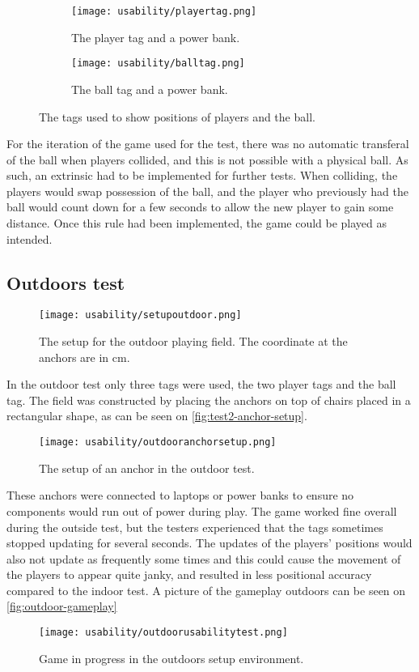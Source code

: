 \begin{figure}[H]
    \centering
    \begin{subfigure}{.45\textwidth}
        \centering
        \texttt{[image: usability/playertag.png]}
        \caption{The player tag and a power bank.}
        \label{fig:sub1}
    \end{subfigure}
    \begin{subfigure}{.45\textwidth}
        \centering
        \texttt{[image: usability/balltag.png]}
        \caption{The ball tag and a power bank.}
        \label{fig:sub2}
    \end{subfigure}
    \caption{The tags used to show positions of players and the ball.}
    \label{fig:two-tags}
\end{figure}
\noindent
For the iteration of the game used for the test, there was no automatic transferal of the ball when players collided, and this is not possible with a physical ball.
As such, an extrinsic had to be implemented for further tests.
When colliding, the players would swap possession of the ball, and the player who previously had the ball would count down for a few seconds to allow the new player to gain some distance.
Once this rule had been implemented, the game could be played as intended.

\subsection{Outdoors test}
\begin{figure}[H]
    \centering
    \texttt{[image: usability/setupoutdoor.png]}
    \caption{The setup for the outdoor playing field. The coordinate at the anchors are in cm.}
    \label{fig:test2-outdoor-setup}
\end{figure}
\noindent
In the outdoor test only three tags were used, the two player tags and the ball tag.
The field was constructed by placing the anchors on top of chairs placed in a rectangular shape, as can be seen on \autoref{fig:test2-anchor-setup}.

\begin{figure}[H]
    \centering
    \texttt{[image: usability/outdooranchorsetup.png]}
    \caption{The setup of an anchor in the outdoor test.}
    \label{fig:test2-anchor-setup}
\end{figure}
\noindent
These anchors were connected to laptops or power banks to ensure no components would run out of power during play.
The game worked fine overall during the outside test, but the testers experienced that the tags sometimes stopped updating for several seconds.
The updates of the players' positions would also not update as frequently some times and this could cause the movement of the players to appear quite janky, and resulted in less positional accuracy compared to the indoor test.
A picture of the gameplay outdoors can be seen on \autoref{fig:outdoor-gameplay}
\begin{figure}[H]
    \centering
    \texttt{[image: usability/outdoorusabilitytest.png]}
    \caption{Game in progress in the outdoors setup environment.}
    \label{fig:outdoor-gameplay}
\end{figure}

